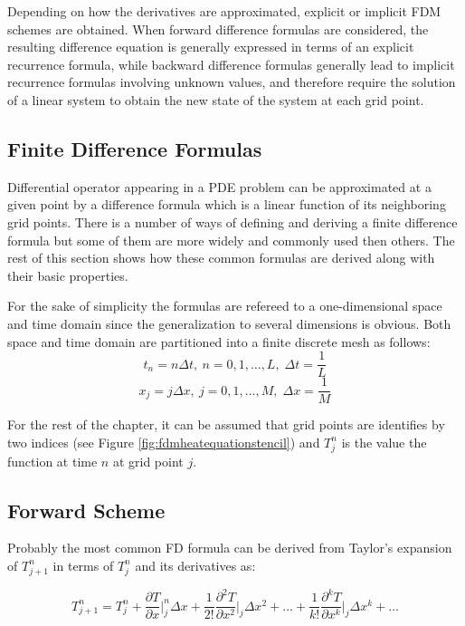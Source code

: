         
    Depending on how the derivatives are approximated, explicit or implicit FDM schemes are
    obtained. When forward difference formulas are considered, the
    resulting difference equation is generally expressed in terms of
    an explicit recurrence formula, while backward difference formulas
    generally lead to implicit recurrence formulas involving unknown
    values, and therefore require the solution of a linear system to
    obtain the new state of the system at each grid point.
    
    
\subsection{Finite Difference Formulas}
Differential operator appearing in a PDE problem can be approximated at a given point by a difference formula which is a linear function of its neighboring grid points. There is a number of ways of defining and deriving a finite difference formula but some of them are more widely and commonly used then others. The rest of this section shows how  these common formulas are derived along with their basic properties. 

For the sake of simplicity the formulas are refereed to a one-dimensional space and time domain since the generalization to several dimensions is obvious.
Both space and time domain are partitioned into a finite discrete mesh as follows:    
 \begin{equation}
    		t_n = n\Delta t, \: n = 0,1,\ldots,L,\; \Delta t= \frac{1}{L}
    \end{equation}
    \begin{equation}
    		x_j = j\Delta x, \: j = 0,1,\ldots,M,\;\Delta x = \frac{1}{M}
    \end{equation}

For the rest of the chapter, it can be assumed that grid points are identifies by two indices (see Figure \ref{fig:fdmheatequationstencil}) and $T_j^n$ is the value the function at time $n$ at grid point $j$.

\subsection{Forward Scheme}
    Probably the most common FD formula can be derived from Taylor's expansion of $T^n_{j+1}$ in terms of $T^n_{j}$ and its derivatives as:
    
    \begin{equation}
    T^n_{j+1} = T^n_{j} +
    \frac{\partial T}{\partial x}\bigg\rvert^n_j \Delta x +
    \frac{1}{2!}  \frac{\partial^2 T}{\partial x^2}\bigg\rvert_j \Delta x^2 + \ldots + 
     \frac{1}{k!}  \frac{\partial^k T}{\partial x^k}\bigg\rvert_j \Delta x^k + \ldots
     \label{eq:taylorexp1}
    \end{equation}
    
